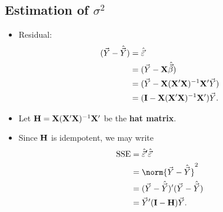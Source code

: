 \subsection*{Estimation of $ \sigma^2 $}
\begin{itemize}
    \item Residual:
          \begin{align*}
              (\vec{Y}-\hat{\vec{Y}})
               & =\hat{\vec{\varepsilon}}                                                \\
               & =(\vec{Y}-\mathbf{X}\hat{\vec{\beta}})                               \\
               & =(\vec{Y}-\mathbf{X}(\mathbf{X}'\mathbf{X})^{-1}\mathbf{X}'\vec{Y})  \\
               & =(\mathbf{I}-\mathbf{X}(\mathbf{X}'\mathbf{X})^{-1}\mathbf{X}')\vec{Y}.
          \end{align*}
    \item Let $ \mathbf{H}=\mathbf{X}(\mathbf{X}'\mathbf{X})^{-1}\mathbf{X}' $ be the \textbf{hat matrix}.
    \item Since $ \mathbf{H} $ is idempotent, we may write
          \begin{align*}
              \text{SSE}
               & =\hat{\Vector{\varepsilon}}'\hat{\Vector{\varepsilon}}       \\
               & =\norm{\Vector{Y}-\hat{\Vector{Y}}}^2                        \\
               & =(\Vector{Y}-\hat{\Vector{Y}})'(\Vector{Y}-\hat{\Vector{Y}}) \\
               & =\Vector{Y}'(\Matrix{I}-\Matrix{H})\Vector{Y}.
          \end{align*}
\end{itemize}
